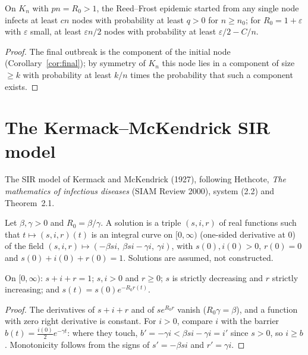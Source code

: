 \begin{corollary}\label{cor:outbreak}
\leanok{}
On $K_n$ with $pn=R_0>1$, the Reed--Frost epidemic started from any single node infects at least
$cn$ nodes with probability at least $q>0$ for $n\ge n_0$; for $R_0=1+\varepsilon$ with
$\varepsilon$ small, at least $\varepsilon n/2$ nodes with probability at least
$\varepsilon/2-C/n$.
\end{corollary}
\begin{proof}\leanok
The final outbreak is the component of the initial node (Corollary~\ref{cor:final}); by symmetry
of $K_n$ this node lies in a component of size $\ge k$ with probability at least $k/n$ times the
probability that such a component exists.
\end{proof}

\section{The Kermack--McKendrick SIR model}\label{sec:kermack-mckendrick}
The SIR model of Kermack and McKendrick (1927), following Hethcote, \emph{The mathematics of
infectious diseases} (SIAM Review 2000), system (2.2) and Theorem~2.1.
\begin{definition}[Solutions]\label{def:km}
\leanok
Let $\beta,\gamma>0$ and $R_0=\beta/\gamma$. A solution is a triple $(s,i,r)$ of real functions
such that $t\mapsto(s,i,r)(t)$ is an integral curve on $[0,\infty)$ (one-sided derivative at $0$)
of the field $(s,i,r)\mapsto(-\beta si,\ \beta si-\gamma i,\ \gamma i)$, with $s(0),i(0)>0$,
$r(0)=0$ and $s(0)+i(0)+r(0)=1$. Solutions are assumed, not constructed.
\end{definition}

\begin{theorem}[Invariants]\label{thm:km-basic}
\leanok{}
On $[0,\infty)$: $s+i+r=1$; $s,i>0$ and $r\ge0$; $s$ is strictly decreasing and $r$ strictly
increasing; and $s(t)=s(0)e^{-R_0r(t)}$.
\end{theorem}
\begin{proof}\leanok
The derivatives of $s+i+r$ and of $se^{R_0r}$ vanish ($R_0\gamma=\beta$), and a function with
zero right derivative is constant. For $i>0$, compare $i$ with the barrier
$b(t)=\tfrac{i(0)}2e^{-\gamma t}$: where they touch, $b'=-\gamma i<\beta si-\gamma i=i'$ since
$s>0$, so $i\ge b$. Monotonicity follows from the signs of $s'=-\beta si$ and $r'=\gamma i$.
\end{proof}

